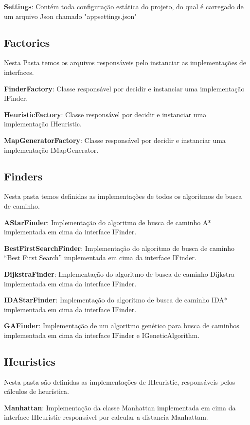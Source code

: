  \textbf{Settings}: Contém toda configuração estática do projeto, do qual é carregado de um arquivo Json chamado "appsettings.json"
 
 \subsection{Factories}
 
 Nesta Pasta temos os arquivos responsáveis pelo instanciar as implementações de interfaces.
 
 \textbf{FinderFactory}: Classe responsável por decidir e instanciar uma implementação IFinder.
 
 \textbf{HeuristicFactory}: Classe responsável por decidir e instanciar uma implementação IHeuristic.
 
 \textbf{MapGeneratorFactory}: Classe responsável por decidir e instanciar uma implementação IMapGenerator.
 
 \subsection{Finders}
 
 Nesta pasta temos definidas as implementações de todos os algoritmos de busca de caminho.
 
 \textbf{AStarFinder}: Implementação do algoritmo de busca de caminho A* implementada em cima da interface IFinder.
 
 \textbf{BestFirstSearchFinder}: Implementação do algoritmo de busca de caminho “Best First Search” implementada em cima da interface IFinder.
 
 \textbf{DijkstraFinder}: Implementação do algoritmo de busca de caminho Dijkstra implementada em cima da interface IFinder.
 
 \textbf{IDAStarFinder}: Implementação do algoritmo de busca de caminho IDA* implementada em cima da interface IFinder.
 
 \textbf{GAFinder}: Implementação de um algoritmo genético para busca de caminhos implementada em cima da interface IFinder e IGeneticAlgorithm.
 
 \subsection{Heuristics}
 
 Nesta pasta são definidas as implementações de IHeuristic, responsáveis pelos cálculos de heurística.
 
 \textbf{Manhattan}: Implementação da classe Manhattan implementada em cima da interface IHeuristic responsável por calcular a distancia Manhattam.
 
